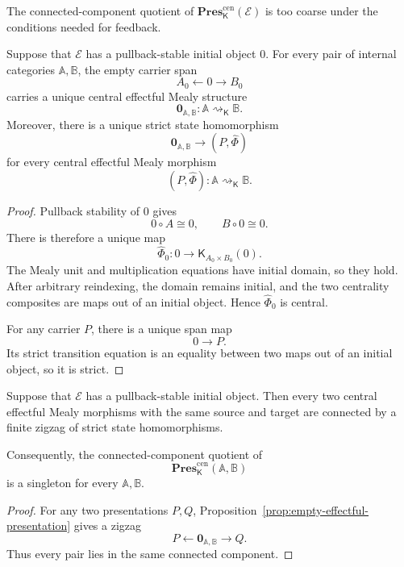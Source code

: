 The connected-component quotient of
\(\mathbf{Pres}^{\mathrm{cen}}_{\mathsf K}(\mathcal E)\) is too coarse under
the conditions needed for feedback.

\begin{proposition}
\label{prop:empty-effectful-presentation}
Suppose that \(\mathcal E\) has a pullback-stable initial object \(0\).
For every pair of internal categories \(\mathbb A,\mathbb B\), the empty
carrier span
\[
    A_0\longleftarrow0\longrightarrow B_0
\]
carries a unique central effectful Mealy structure
\[
    \mathbf 0_{\mathbb A,\mathbb B}:
    \mathbb A\rightsquigarrow_{\mathsf K}\mathbb B.
\]
Moreover, there is a unique strict state homomorphism
\[
    \mathbf 0_{\mathbb A,\mathbb B}
    \longrightarrow
    (P,\widehat\Phi)
\]
for every central effectful Mealy morphism
\[
    (P,\widehat\Phi):
    \mathbb A\rightsquigarrow_{\mathsf K}\mathbb B.
\]
\end{proposition}

\begin{proof}
Pullback stability of \(0\) gives
\[
    0\circ A\cong0,
    \qquad
    B\circ0\cong0.
\]
There is therefore a unique map
\[
    \widehat\Phi_0:
    0\longrightarrow
    \mathsf K_{A_0\times B_0}(0).
\]
The Mealy unit and multiplication equations have initial domain, so they
hold.  After arbitrary reindexing, the domain remains initial, and the two
centrality composites are maps out of an initial object.  Hence
\(\widehat\Phi_0\) is central.

For any carrier \(P\), there is a unique span map
\[
    0\to P.
\]
Its strict transition equation is an equality between two maps out of an
initial object, so it is strict.
\end{proof}

\begin{theorem}
\label{thm:degeneracy-unrestricted-strict-uniformity}
Suppose that \(\mathcal E\) has a pullback-stable initial object.  Then every
two central effectful Mealy morphisms with the same source and target are
connected by a finite zigzag of strict state homomorphisms.

Consequently, the connected-component quotient of
\[
    \mathbf{Pres}^{\mathrm{cen}}_{\mathsf K}
    (\mathbb A,\mathbb B)
\]
is a singleton for every \(\mathbb A,\mathbb B\).
\end{theorem}

\begin{proof}
For any two presentations \(P,Q\),
Proposition~\ref{prop:empty-effectful-presentation} gives a zigzag
\[
    P
    \longleftarrow
    \mathbf0_{\mathbb A,\mathbb B}
    \longrightarrow
    Q.
\]
Thus every pair lies in the same connected component.
\end{proof}

